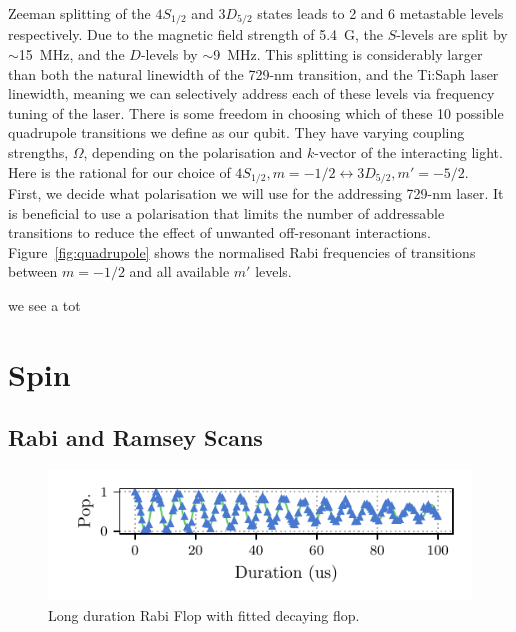     Zeeman splitting of the $4S_{1/2}$ and $3D_{5/2}$ states leads to 2 and 6
    metastable levels respectively. Due to the magnetic field strength of 5.4~G,
    the $S$-levels are split by $\sim$15~MHz, and the $D$-levels by $\sim$9~MHz.
    This splitting is considerably larger than both the natural linewidth of the
    729-nm transition, and the Ti:Saph laser linewidth, meaning we can
    selectively address each of these levels via frequency tuning of the laser. There is some freedom in choosing which of these 10 possible quadrupole transitions we define as our qubit. They have varying coupling strengths, $\Omega$, depending on the polarisation and $k$-vector of the interacting light. Here is the rational for our choice of $4S_{1/2}, m = -1/2 \leftrightarrow 3D_{5/2}, m' = -5/2$.\\
    First, we decide what polarisation we will use for the addressing 729-nm laser. It is beneficial to use a polarisation that limits the number of addressable transitions to reduce the effect of unwanted off-resonant interactions. Figure~\ref{fig:quadrupole} shows the normalised Rabi frequencies of transitions between $m=-1/2$ and all available $m'$ levels.
    
    we see a tot

\section{Spin}
\label{sec:Spin}

\subsection{Rabi and Ramsey Scans}

    \begin{figure}
        \begin{center}
        \noindent\includegraphics[width=\linewidth]{
            figures/pdf_figure/long_flop.pdf
            }
        \end{center}
        \caption{Long duration Rabi Flop with fitted decaying flop.
            }
        \label{fig:Long Flop}
    \end{figure}

